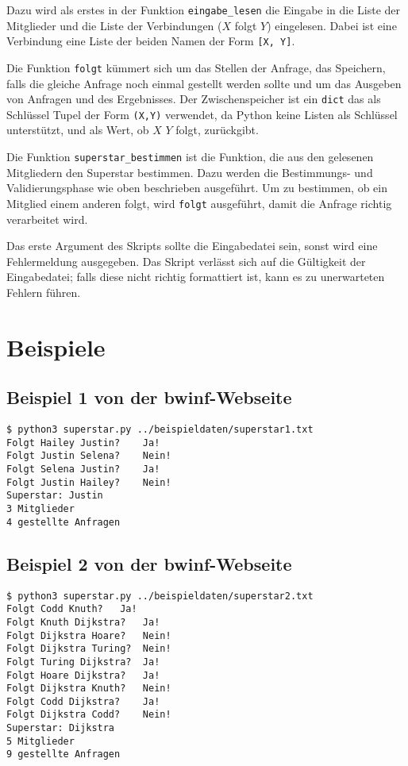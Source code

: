 \documentclass[a4paper,10pt,ngerman]{scrartcl}
\begin{document}
Dazu wird als erstes in der Funktion \texttt{eingabe\_lesen} die Eingabe in die Liste der Mitglieder und die Liste der Verbindungen ($X$ folgt $Y$) eingelesen. Dabei ist eine Verbindung eine Liste der beiden Namen der Form \texttt{[X, Y]}. 

Die Funktion \texttt{folgt} kümmert sich um das Stellen der Anfrage, das Speichern, falls die gleiche Anfrage noch einmal gestellt werden sollte und um das Ausgeben von Anfragen und des Ergebnisses. Der Zwischenspeicher ist ein \texttt{dict} das als Schlüssel Tupel der Form \texttt{(X,Y)} verwendet, da Python keine Listen als Schlüssel unterstützt, und als Wert, ob $X$ $Y$ folgt, zurückgibt. 

Die Funktion \texttt{superstar\_bestimmen} ist die Funktion, die aus den gelesenen Mitgliedern den Superstar bestimmen. Dazu werden die Bestimmungs- und Validierungsphase wie oben beschrieben ausgeführt. Um zu bestimmen, ob ein Mitglied einem anderen folgt, wird \texttt{folgt} ausgeführt, damit die Anfrage richtig verarbeitet wird.

Das erste Argument des Skripts sollte die Eingabedatei sein, sonst wird eine Fehlermeldung ausgegeben. Das Skript verlässt sich auf die Gültigkeit der Eingabedatei; falls diese nicht richtig formattiert ist, kann es zu unerwarteten Fehlern führen.

\section{Beispiele}

\subsection{Beispiel 1 von der bwinf-Webseite}
\begin{lstlisting}
$ python3 superstar.py ../beispieldaten/superstar1.txt
Folgt Hailey Justin? 	Ja!
Folgt Justin Selena? 	Nein!
Folgt Selena Justin? 	Ja!
Folgt Justin Hailey? 	Nein!
Superstar: Justin
3 Mitglieder
4 gestellte Anfragen
\end{lstlisting}

\subsection{Beispiel 2 von der bwinf-Webseite}
\begin{lstlisting}
$ python3 superstar.py ../beispieldaten/superstar2.txt
Folgt Codd Knuth? 	Ja!
Folgt Knuth Dijkstra? 	Ja!
Folgt Dijkstra Hoare? 	Nein!
Folgt Dijkstra Turing? 	Nein!
Folgt Turing Dijkstra? 	Ja!
Folgt Hoare Dijkstra? 	Ja!
Folgt Dijkstra Knuth? 	Nein!
Folgt Codd Dijkstra? 	Ja!
Folgt Dijkstra Codd? 	Nein!
Superstar: Dijkstra
5 Mitglieder
9 gestellte Anfragen
\end{lstlisting}
\end{document}
